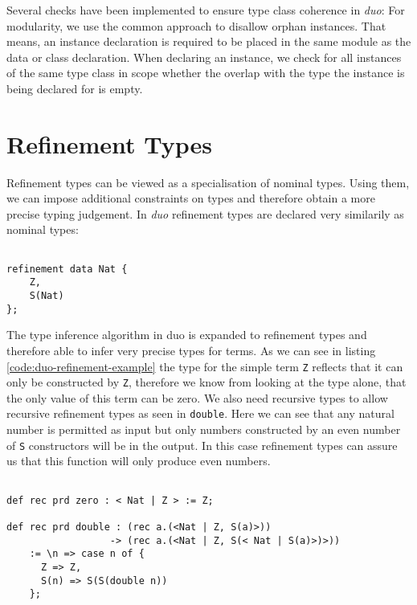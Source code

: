 Several checks have been implemented to ensure type class coherence in \emph{duo}:
For modularity, we use the common approach to disallow orphan instances. \cite{Kilpatrick2019-cy}
That means, an instance declaration is required to be placed in the same module as the data or class declaration.
When declaring an instance, we check for all instances of the same type class in scope whether the overlap with the type the instance is being declared for is empty.


\section{Refinement Types}
\label{sec:refinement-types}

Refinement types can be viewed as a specialisation of nominal types.
Using them, we can impose additional constraints on types and therefore obtain a more precise typing judgement. \cite{springer} %
In \emph{duo} refinement types are declared very similarily as nominal types:

\begin{lstlisting}[style=duostyle, label=code:duo-refinement-declaration, captionpos=b, caption={Refinement type of peano numbers in \emph{duo}}]

refinement data Nat {
    Z,
    S(Nat)
};

\end{lstlisting}

The type inference algorithm in duo is expanded to refinement types and therefore able to infer very precise types for terms. \cite{binder22refinement}
As we can see in listing \ref{code:duo-refinement-example} the type for the simple term \lstinline{Z} reflects that it can only be constructed by \lstinline{Z}, therefore we know from looking at the type alone, that the only value of this term can be zero.
We also need recursive types to allow recursive refinement types as seen in \lstinline{double}.
Here we can see that any natural number is permitted as input but only numbers constructed by an even number of \lstinline{S} constructors will be in the output.
In this case refinement types can assure us that this function will only produce even numbers.

\begin{lstlisting}[style=duostyle, label=code:duo-refinement-example, captionpos=b, caption={Type inference for refinement types in \emph{duo}}]

def rec prd zero : < Nat | Z > := Z;

def rec prd double : (rec a.(<Nat | Z, S(a)>))
                  -> (rec a.(<Nat | Z, S(< Nat | S(a)>)>))
    := \n => case n of {
      Z => Z,
      S(n) => S(S(double n))
    };
    
\end{lstlisting}

